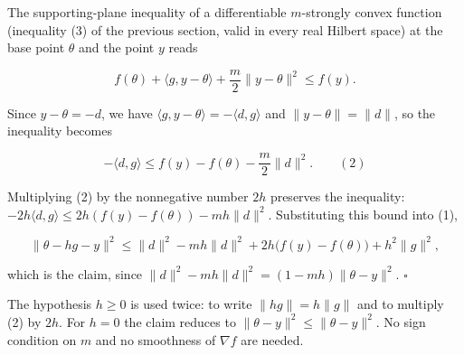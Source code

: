 \documentclass[11pt,a4paper]{article}
\begin{document}
The supporting-plane inequality of a differentiable \(m\)-strongly convex function (inequality (3) of the previous section, valid in every real Hilbert space) at the base point \(\theta\) and the point \(y\) reads


\[f(\theta)+\langle g,y-\theta\rangle+\frac m2\|y-\theta\|^2\le f(y).\]


Since \(y-\theta=-d\), we have \(\langle g,y-\theta\rangle=-\langle d,g\rangle\) and \(\|y-\theta\|=\|d\|\), so the inequality becomes


\[-\langle d,g\rangle\le f(y)-f(\theta)-\frac m2\|d\|^2.\qquad(2)\]


Multiplying (2) by the nonnegative number \(2h\) preserves the inequality: \(-2h\langle d,g\rangle\le2h(f(y)-f(\theta))-mh\|d\|^2\). Substituting this bound into (1),


\[\|\theta-hg-y\|^2\le\|d\|^2-mh\|d\|^2+2h\bigl(f(y)-f(\theta)\bigr)+h^2\|g\|^2,\]


which is the claim, since \(\|d\|^2-mh\|d\|^2=(1-mh)\|\theta-y\|^2\). \(\square\)




The hypothesis \(h\ge0\) is used twice: to write \(\|hg\|=h\|g\|\) and to multiply (2) by \(2h\). For \(h=0\) the claim reduces to \(\|\theta-y\|^2\le\|\theta-y\|^2\). No sign condition on \(m\) and no smoothness of \(\nabla f\) are needed.
\end{document}
